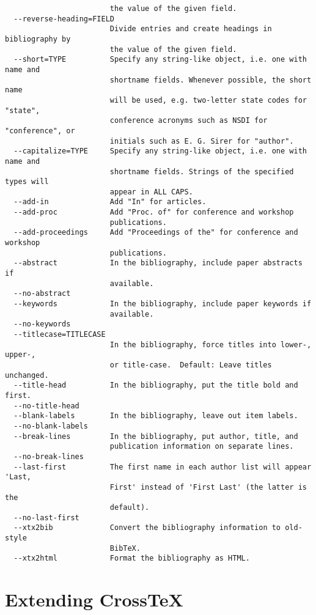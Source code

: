 \documentclass{article}
\newcommand{\XTeX}{Cross\TeX}
\begin{document}
\begin{small}
\begin{verbatim}
                        the value of the given field.
  --reverse-heading=FIELD
                        Divide entries and create headings in bibliography by
                        the value of the given field.
  --short=TYPE          Specify any string-like object, i.e. one with name and
                        shortname fields. Whenever possible, the short name
                        will be used, e.g. two-letter state codes for "state",
                        conference acronyms such as NSDI for "conference", or
                        initials such as E. G. Sirer for "author".
  --capitalize=TYPE     Specify any string-like object, i.e. one with name and
                        shortname fields. Strings of the specified types will
                        appear in ALL CAPS.
  --add-in              Add "In" for articles.
  --add-proc            Add "Proc. of" for conference and workshop
                        publications.
  --add-proceedings     Add "Proceedings of the" for conference and workshop
                        publications.
  --abstract            In the bibliography, include paper abstracts if
                        available.
  --no-abstract         
  --keywords            In the bibliography, include paper keywords if
                        available.
  --no-keywords         
  --titlecase=TITLECASE
                        In the bibliography, force titles into lower-, upper-,
                        or title-case.  Default: Leave titles unchanged.
  --title-head          In the bibliography, put the title bold and first.
  --no-title-head       
  --blank-labels        In the bibliography, leave out item labels.
  --no-blank-labels     
  --break-lines         In the bibliography, put author, title, and
                        publication information on separate lines.
  --no-break-lines      
  --last-first          The first name in each author list will appear 'Last,
                        First' instead of 'First Last' (the latter is the
                        default).
  --no-last-first       
  --xtx2bib             Convert the bibliography information to old-style
                        BibTeX.
  --xtx2html            Format the bibliography as HTML.
\end{verbatim}\end{small}

\section{Extending \XTeX{}}
\label{extending}
\end{document}
